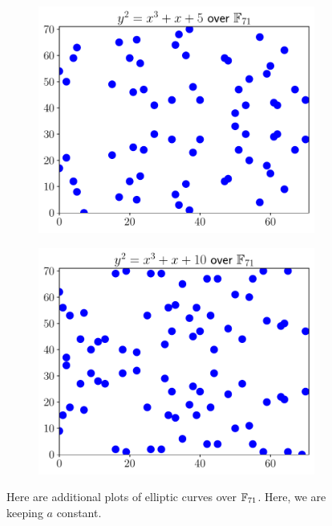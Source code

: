 \begin{figure}[p]
    \begin{subfigure}[t]{0.45\textwidth}
    \includegraphics[width=\textwidth]{plots/ec_finite/ec_finite_F_71_1_5.pdf}
    \end{subfigure}
    \begin{subfigure}[t]{0.45\textwidth}
    \includegraphics[width=\textwidth]{plots/ec_finite/ec_finite_F_71_1_10.pdf}
    \end{subfigure}
    \caption[Plots of elliptic curves over finite fields 2]{Here
        are additional plots of \glspl{elliptic curve} over $\mathbb{F}_{71}$.
        Here, we are keeping $a$ constant.}
    \label{fig:ec_finite_plots_2}
\end{figure}
